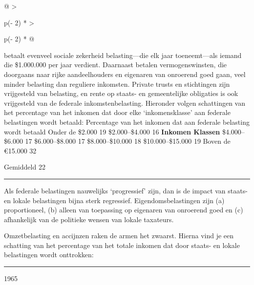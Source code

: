 \documentclass[
  a5paper,
  smalldemyvopaper,10pt,twoside,onecolumn,openright,extrafontsizes,hidelinks]{memoir}
\renewenvironment{quote}%
               {\list{}{\rightmargin=.6cm\leftmargin=.6cm}%
                \itshape \item[]}%
               {\endlist}
\begin{document}
\begin{longtable}[]{@{}
  >{\raggedright\arraybackslash}p{(\columnwidth - 2\tabcolsep) * }
  >{\raggedright\arraybackslash}p{(\columnwidth - 2\tabcolsep) * }@{}}
{betaalt evenveel sociale zekerheid belasting---die elk jaar
toeneemt---als iemand die \$1.000.000 per jaar verdient. Daarnaast
betalen vermogenswinsten, die doorgaans naar rijke aandeelhouders en
eigenaren van onroerend goed gaan, veel minder belasting dan reguliere
inkomsten. Private trusts en stichtingen zijn vrijgesteld van belasting,
en rente op staats- en gemeentelijke obligaties is ook vrijgesteld van
de federale inkomstenbelasting. Hieronder volgen schattingen van het
percentage van het inkomen dat door elke `inkomensklasse' aan federale
belastingen wordt betaald: \textbar{} Percentage van het inkomen dat aan
federale belasting wordt betaald \textbar{} \textbar{} Onder de \$2.000
\textbar{} 19 \textbar{} \textbar{} \$2.000--\$4.000 \textbar{} 16
\textbar{} \textbar{} \textbf{Inkomen Klassen} \$4.000--\$6.000
\textbar{} 17 \textbar{} \textbar{} \$6.000--\$8.000 \textbar{} 17
\textbar{} \textbar{} \$8.000--\$10.000 \textbar{} 18 \textbar{}
\textbar{} \$10.000--\$15.000 \textbar{} 19 \textbar{} \textbar{} Boven
de €15.000 \textbar{} 32} \\
\end{longtable}

\begin{quote}
Gemiddeld 22
\end{quote}

\begin{center}\rule{0.5\linewidth}{0.5pt}\end{center}

Als federale belastingen nauwelijks `progressief' zijn, dan is de impact
van staats- en lokale belastingen bijna sterk regressief.
Eigendomsbelastingen zijn (a) proportioneel, (b) alleen van toepassing
op eigenaren van onroerend goed en (c) afhankelijk van de politieke
wensen van lokale taxateurs.

Omzetbelasting en accijnzen raken de armen het zwaarst. Hierna vind je
een schatting van het percentage van het totale inkomen dat door staats-
en lokale belastingen wordt onttrokken:

\begin{center}\rule{0.5\linewidth}{0.5pt}\end{center}

1965
\end{document}
